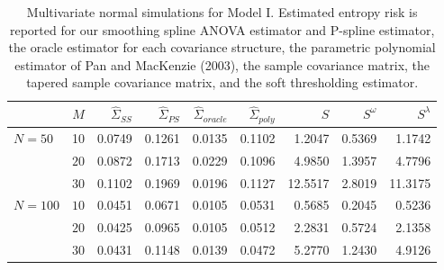 \begin{table}[H]
\centering
\caption{Multivariate normal simulations for Model I. Estimated entropy risk is reported for our smoothing spline ANOVA estimator and P-spline estimator, the oracle estimator for each covariance structure, the parametric polynomial estimator of Pan and MacKenzie (2003), the sample covariance matrix, the tapered sample covariance matrix, and the soft thresholding estimator.} 
\begin{tabular}{lrrrrrrrr}
 & $M$ &$\hat{\Sigma}_{SS}$& $\hat{\Sigma}_{PS}$ &$\hat{\Sigma}_{oracle}$& $\hat{\Sigma}_{poly}$ & $S$ &$S^\omega$& $S^\lambda$ \\ 
  \hline
$N = 50$ & 10 & 0.0749 & 0.1261 & 0.0135 & 0.1102 & 1.2047 & 0.5369 & 1.1742 \\ 
   & $20$ & 0.0872 & 0.1713 & 0.0229 & 0.1096 & 4.9850 & 1.3957 & 4.7796 \\ 
   & $30$ & 0.1102 & 0.1969 & 0.0196 & 0.1127 & 12.5517 & 2.8019 & 11.3175 \\ 
 $N = 100$ & $10$ & 0.0451 & 0.0671 & 0.0105 & 0.0531 & 0.5685 & 0.2045 & 0.5236 \\ 
   & $20$ & 0.0425 & 0.0965 & 0.0105 & 0.0512 & 2.2831 & 0.5724 & 2.1358 \\ 
   & $30$ & 0.0431 & 0.1148 & 0.0139 & 0.0472 & 5.2770 & 1.2430 & 4.9126 \\ 
   \hline
\end{tabular}
\label{table:simulation-1-entropy-loss-sigma-1}
\end{table}
